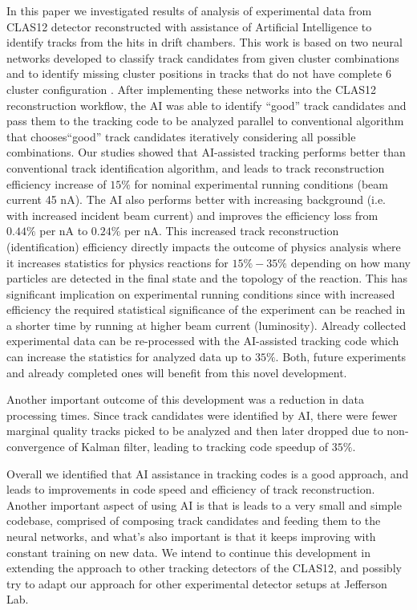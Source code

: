 In this paper we investigated results of analysis of experimental data from CLAS12 detector reconstructed with assistance of Artificial Intelligence
to identify tracks from the hits in drift chambers. This work is based on two neural networks developed to classify track candidates from
given cluster combinations \cite{Gavalian:2020oxg} and to identify missing cluster positions in tracks that do not have complete 6 cluster configuration \cite{Gavalian:2020xmc}. After implementing these networks into the CLAS12 reconstruction workflow, the AI was able to identify ``good'' track candidates 
and pass them to the tracking code to be analyzed parallel to conventional algorithm that chooses``good'' track candidates iteratively considering all possible combinations. 
Our studies showed that AI-assisted tracking performs better than conventional track identification algorithm, and leads to track reconstruction efficiency increase of $15\%$ for nominal experimental running conditions (beam current 45 nA). The AI also performs better with increasing background (i.e. with increased incident beam current) and improves the efficiency loss from $0.44\%$ per nA to $0.24\%$ per nA.
This increased track reconstruction (identification) efficiency directly impacts the outcome of physics analysis where it increases statistics 
for physics reactions for $15\%-35\%$ depending on how many particles are detected in the final state and the topology of the reaction. This has significant implication on experimental running conditions since with increased efficiency the required statistical significance of the experiment can be reached in a shorter time by running at higher beam current (luminosity). Already collected experimental data can be re-processed with the AI-assisted tracking
code which can increase the statistics for analyzed data up to $35\%$. Both, future experiments and already completed ones will benefit 
from this novel development.

Another important outcome of this development was a reduction in data processing times. Since track candidates were identified by AI, there were fewer marginal quality tracks picked to be analyzed and then later dropped due to non-convergence of Kalman filter, leading to tracking code speedup  of $35\%$.

Overall we identified that AI assistance in tracking codes is a good approach, and leads to improvements in code speed and 
efficiency of track reconstruction. Another important aspect of using AI is that is leads to a very small and simple codebase, comprised of composing track candidates and feeding them to the neural networks, and what's also important is that it keeps improving with constant training on new data.
We intend to continue this development in extending the approach to other tracking detectors of the CLAS12, and possibly try to adapt  our approach for other experimental detector setups at Jefferson Lab.

